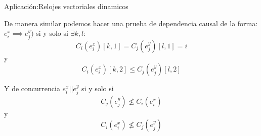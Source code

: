 \begin{frame}[fragile]{Aplicación:}{Relojes vectoriales dinamicos}
    \justifying
    
    De manera similar podemos hacer una prueba de dependencia causal de la forma:
    $e_i^x \implies e_j^y)$ si y solo si $\exists k,l$:
    $$C_i(e_i^x)[k,1] = C_j(e_j^y)[l,1] = i$$
    y 
    $$C_i(e_i^x)[k,2] \leq C_j(e_j^y)[l,2]$$

    Y de concurrencia
    $e_i^x || e_j^y$ si y solo si
    $$C_j(e_j^y) \nleq C_i(e_i^x)$$
    y
    $$C_i(e_i^x) \nleq C_j(e_j^y)$$
\end{frame}